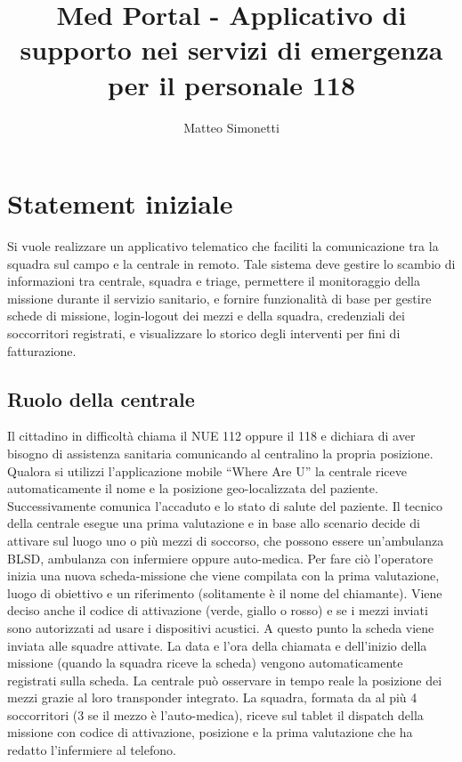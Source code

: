 \documentclass{article}
\title{Med Portal - Applicativo di supporto nei servizi di emergenza per il personale 118}
\author{Matteo Simonetti}
\date{}
\begin{document}
    \maketitle
    \tableofcontents

    \section{Statement iniziale}

    Si vuole realizzare un applicativo telematico che faciliti la comunicazione tra la squadra sul campo e la centrale in remoto. Tale sistema deve gestire lo scambio di informazioni tra centrale, squadra e triage, permettere il monitoraggio della missione durante il servizio sanitario, e fornire funzionalità di base per gestire schede di missione, login-logout dei mezzi e della squadra, credenziali dei soccorritori registrati, e visualizzare lo storico degli interventi per fini di fatturazione.

    \subsection{Ruolo della centrale}
    Il cittadino in difficoltà chiama il NUE 112 oppure il 118 e dichiara di aver bisogno di assistenza sanitaria comunicando al centralino la propria posizione. Qualora si utilizzi l’applicazione mobile “Where Are U” la centrale riceve automaticamente il nome e la posizione geo-localizzata del paziente. Successivamente comunica l’accaduto e lo stato di salute del paziente. Il tecnico della centrale esegue una prima valutazione e in base allo scenario decide di attivare sul luogo uno o più mezzi di soccorso, che possono essere un’ambulanza BLSD, ambulanza con infermiere oppure auto-medica. Per fare ciò l’operatore inizia una nuova scheda-missione che viene compilata con la prima valutazione, luogo di obiettivo e un riferimento (solitamente è il nome del chiamante). Viene deciso anche il codice di attivazione (verde, giallo o rosso) e se i mezzi inviati sono autorizzati ad usare i dispositivi acustici.
    A questo punto la scheda viene inviata alle squadre attivate.
    La data e l’ora della chiamata e dell’inizio della missione (quando la squadra riceve la scheda) vengono automaticamente registrati sulla scheda.
    La centrale può osservare in tempo reale la posizione dei mezzi grazie al loro transponder integrato.
    La squadra, formata da al più 4 soccorritori (3 se il mezzo è l’auto-medica), riceve sul tablet il dispatch della missione con codice di attivazione, posizione e la prima valutazione che ha redatto l’infermiere al telefono.
\end{document}
